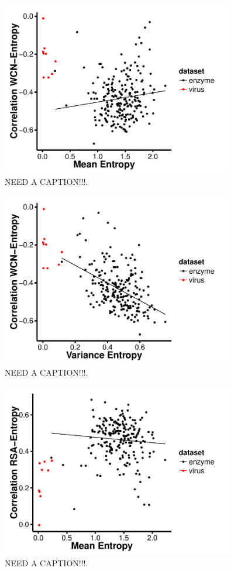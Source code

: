 \documentclass[12pt]{article}
\begin{document}
    \begin{figure}[H]
            \centerline{\includegraphics[width=4in]{mean_entropy_wcn_cor.pdf}}
            \caption{NEED A CAPTION!!!.}
            \label{fig:seqent_structure_cors}
    \end{figure}

    \begin{figure}[H]
            \centerline{\includegraphics[width=4in]{var_entropy_wcn_cor.pdf}}
            \caption{NEED A CAPTION!!!.}
            \label{fig:seqent_structure_cors}
    \end{figure}

    \begin{figure}[H]
            \centerline{\includegraphics[width=4in]{mean_entropy_rsa_cor.pdf}}
            \caption{NEED A CAPTION!!!.}
            \label{fig:seqent_structure_cors}
    \end{figure}
\end{document}
